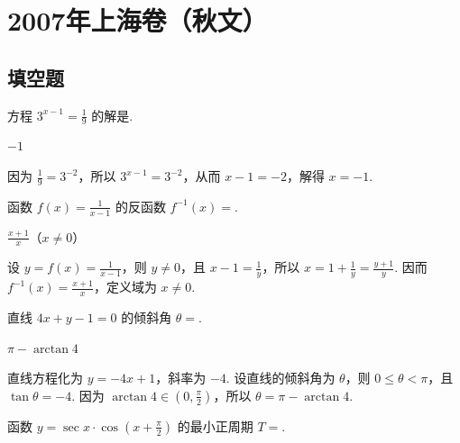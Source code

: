 \chapter{2007年上海卷（秋文）}

\section{填空题}

\begin{problem}
方程 \(3^{x-1} = \frac{1}{9}\) 的解是\fillinblank{}.
\end{problem}

\begin{answer}
\(-1\)
\end{answer}

\begin{solution}
因为 \(\frac{1}{9}=3^{-2}\)，所以 \(3^{x-1}=3^{-2}\)，从而 \(x-1=-2\)，解得 \(x=-1\).
\end{solution}

\begin{problem}
函数 \(f(x)=\frac{1}{x-1}\) 的反函数 \(f^{-1}(x)=\)\fillinblank{}.
\end{problem}

\begin{answer}
\(\frac{x+1}{x}\)（\(x\neq0\)）
\end{answer}

\begin{solution}
设 \(y=f(x)=\frac{1}{x-1}\)，则 \(y\neq0\)，且 \(x-1=\frac{1}{y}\)，所以 \(x=1+\frac{1}{y}=\frac{y+1}{y}\). 因而 \(f^{-1}(x)=\frac{x+1}{x}\)，定义域为 \(x\neq0\).
\end{solution}

\begin{problem}
直线 \(4x + y - 1 = 0\) 的倾斜角 \(\theta =\)\fillinblank{}.
\end{problem}

\begin{answer}
\(\pi-\arctan4\)
\end{answer}

\begin{solution}
直线方程化为 \(y=-4x+1\)，斜率为 \(-4\). 设直线的倾斜角为 \(\theta\)，则 \(0\leqslant\theta<\pi\)，且 \(\tan\theta=-4\). 因为 \(\arctan4\in\left(0,\frac{\pi}{2}\right)\)，所以 \(\theta=\pi-\arctan4\).
\end{solution}

\begin{problem}
函数 \(y = \sec x \cdot \cos \left( x + \frac{\pi}{2} \right)\) 的最小正周期 \(T =\)\fillinblank{}.
\end{problem}

